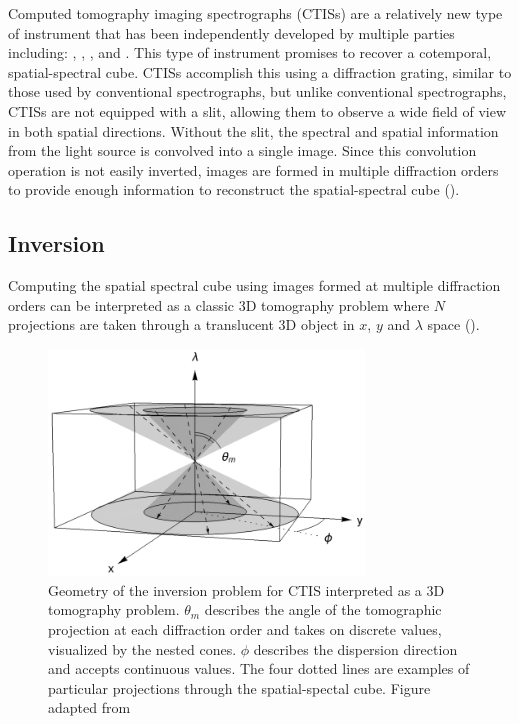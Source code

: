 \documentclass{article}
\begin{document}
			Computed tomography imaging spectrographs (CTISs) are a relatively new type of instrument that has been independently developed by multiple parties including: \cite{Okamoto:91}, \cite{bulygin:92}, \cite{Descour:95}, and \cite{kankel1}. This type of instrument promises to recover a cotemporal, spatial-spectral cube. CTISs accomplish this using a diffraction grating, similar to those used by conventional spectrographs, but unlike conventional spectrographs, CTISs are not equipped with a slit, allowing them to observe a wide field of view in both spatial directions. Without the slit, the spectral and spatial information from the light source is convolved into a single image. Since this convolution operation is not easily inverted, images are formed in multiple diffraction orders to provide enough information to reconstruct the spatial-spectral cube (\cite{inversion}).	
			 
		\subsection{Inversion}
		
			Computing the spatial spectral cube using images formed at multiple diffraction orders can be interpreted as a classic 3D tomography problem where $N$ projections are taken through a translucent 3D object in $x$, $y$ and $\lambda$ space (\cite{Bulygin:05}).
			\begin{figure}[h!]
				\centering
				\includegraphics[width=0.75\textwidth]{figures/tomography}
				\caption{Geometry of the inversion problem for CTIS interpreted as a 3D tomography problem. $\theta_m$ describes the angle of the tomographic projection at each diffraction order and takes on discrete values, visualized by the nested cones. $\phi$ describes the dispersion direction and accepts continuous values. The four dotted lines are examples of particular projections through the spatial-spectal cube. Figure adapted from \cite{Bulygin:05}}
				\label{tomography}
			\end{figure}
			
\end{document}
